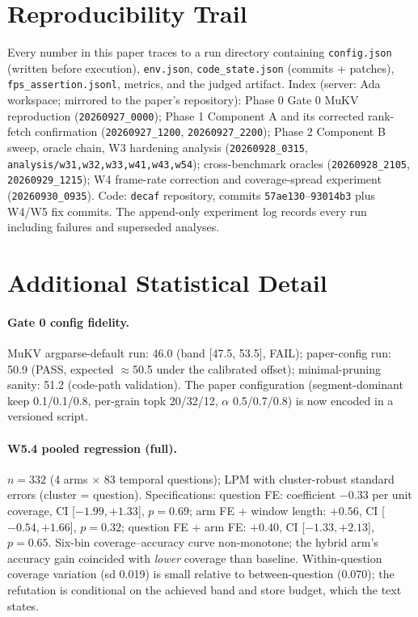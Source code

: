 \section{Reproducibility Trail}
\label{app:repro}

Every number in this paper traces to a run directory containing \texttt{config.json} (written before execution), \texttt{env.json}, \texttt{code\_state.json} (commits + patches), \texttt{fps\_assertion.jsonl}, metrics, and the judged artifact. Index (server: Ada workspace; mirrored to the paper's repository): Phase 0 Gate 0 MuKV reproduction (\texttt{20260927\_0000}); Phase 1 Component A and its corrected rank-fetch confirmation (\texttt{20260927\_1200}, \texttt{20260927\_2200}); Phase 2 Component B sweep, oracle chain, W3 hardening analysis (\texttt{20260928\_0315}, \texttt{analysis/w31,w32,w33,w41,w43,w54}); cross-benchmark oracles (\texttt{20260928\_2105}, \texttt{20260929\_1215}); W4 frame-rate correction and coverage-spread experiment (\texttt{20260930\_0935}). Code: \texttt{decaf} repository, commits \texttt{57ae130}--\texttt{93014b3} plus W4/W5 fix commits. The append-only experiment log records every run including failures and superseded analyses.

\section{Additional Statistical Detail}
\label{app:extra}

\paragraph{Gate 0 config fidelity.} MuKV argparse-default run: 46.0 (band [47.5, 53.5], FAIL); paper-config run: 50.9 (PASS, expected $\approx$50.5 under the calibrated offset); minimal-pruning sanity: 51.2 (code-path validation). The paper configuration (segment-dominant keep 0.1/0.1/0.8, per-grain topk 20/32/12, $\alpha$ 0.5/0.7/0.8) is now encoded in a versioned script.

\paragraph{W5.4 pooled regression (full).} $n{=}332$ (4 arms $\times$ 83 temporal questions); LPM with cluster-robust standard errors (cluster = question). Specifications: question FE: coefficient $-0.33$ per unit coverage, CI [$-1.99, +1.33$], $p{=}0.69$; arm FE + window length: $+0.56$, CI [$-0.54, +1.66$], $p{=}0.32$; question FE + arm FE: $+0.40$, CI [$-1.33, +2.13$], $p{=}0.65$. Six-bin coverage--accuracy curve non-monotone; the hybrid arm's accuracy gain coincided with \emph{lower} coverage than baseline. Within-question coverage variation (sd 0.019) is small relative to between-question (0.070); the refutation is conditional on the achieved band and store budget, which the text states.

